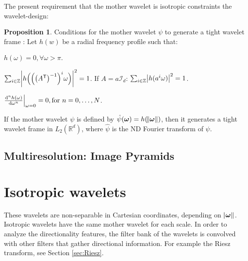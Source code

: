 \documentclass{InsightArticle}
\theoremstyle{definition}
\newtheorem{proposition}{Proposition}
\newcommand{\fft}[1]{\hat{#1}}
\newcommand{\trans}[1]{#1^{\mathsf{T}}}
\def\w{\omega} %
\begin{document}
The present requirement that the mother wavelet is isotropic constraints the wavelet-design:
\begin{proposition}
  Conditions for the mother wavelet $\psi$ to generate a tight wavelet frame \cite{held_steerable_2010, unser_steerable_2011, chenouard_3d_2012}:\newline
Let $h(w)$ be a radial frequency profile such that:
\begin{description}[font=\normalfont , leftmargin=*, labelsep=*, labelindent=*]
    \item[Condition 1:] $h(\w) = 0, \forall \w > \pi$.
    \item[Condition 2:] $\sum_{i \in \mathbb{Z}} \abs{h\Big(\Big(\big(\trans{A}\big)^{-1}\Big)^i\w\Big)}^2 = 1$.\newline
        If $A = a \mathcal{I}_d$: $\sum_{i \in \mathbb{Z}} \abs{h(a^i\w)}^2 = 1$. \cite{held_steerable_2010, aldroubi_wavelets_2007}
    \item[Condition 3:] $\dv[n]{h(\w)}{\w}\Bigr|_{\w=0} = 0, \text{for } n = 0, \ldots, N$.
\end{description}
If the mother wavelet $\psi$ is defined by $\fft{\psi}(\bm{\w})= h(\norm{\bm{\w}})$, then it generates a tight wavelet frame in $L_2(\mathbb{R}^d)$, where $\fft{\psi}$ is the ND Fourier transform of $\psi$.

\end{proposition}


\subsection{Multiresolution: Image Pyramids}

\section{Isotropic wavelets}
\label{sub:Isotropic}
These wavelets are non-separable in Cartesian coordinates, depending on $\norm{\bm{\omega}}$. Isotropic wavelets have the same mother wavelet for each scale. In order to analyze the directionality features, the filter bank of the wavelets is convolved with other filters that gather directional information. For example the Riesz transform, see Section \ref{sec:Riesz}.
\end{document}
